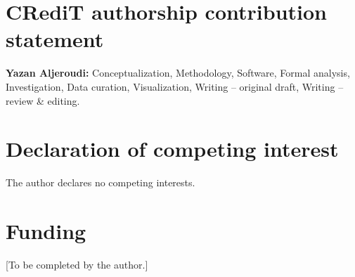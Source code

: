 \documentclass[final,3p]{elsarticle}
\begin{document}
\section*{CRediT authorship contribution statement}
\textbf{Yazan Aljeroudi:} Conceptualization, Methodology, Software, Formal analysis, Investigation, Data curation, Visualization, Writing -- original draft, Writing -- review \& editing.

\section*{Declaration of competing interest}
The author declares no competing interests.

\section*{Funding}
[To be completed by the author.]



\end{document}
